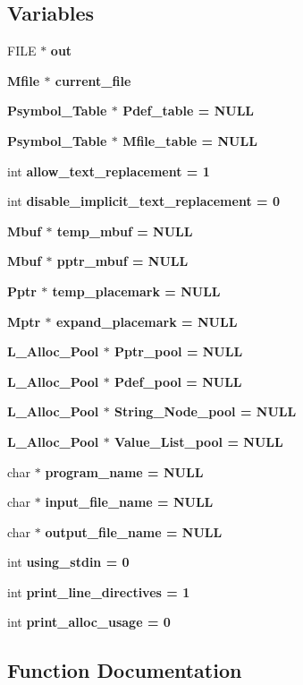 \subsection*{Variables}
\begin{CompactItemize}
\item 
FILE $\ast$ \bf{out}
\item 
\bf{Mfile} $\ast$ \bf{current\_\-file}
\item 
\bf{Psymbol\_\-Table} $\ast$ \bf{Pdef\_\-table} = \bf{NULL}
\item 
\bf{Psymbol\_\-Table} $\ast$ \bf{Mfile\_\-table} = \bf{NULL}
\item 
int \bf{allow\_\-text\_\-replacement} = 1
\item 
int \bf{disable\_\-implicit\_\-text\_\-replacement} = 0
\item 
\bf{Mbuf} $\ast$ \bf{temp\_\-mbuf} = \bf{NULL}
\item 
\bf{Mbuf} $\ast$ \bf{pptr\_\-mbuf} = \bf{NULL}
\item 
\bf{Pptr} $\ast$ \bf{temp\_\-placemark} = \bf{NULL}
\item 
\bf{Mptr} $\ast$ \bf{expand\_\-placemark} = \bf{NULL}
\item 
\bf{L\_\-Alloc\_\-Pool} $\ast$ \bf{Pptr\_\-pool} = \bf{NULL}
\item 
\bf{L\_\-Alloc\_\-Pool} $\ast$ \bf{Pdef\_\-pool} = \bf{NULL}
\item 
\bf{L\_\-Alloc\_\-Pool} $\ast$ \bf{String\_\-Node\_\-pool} = \bf{NULL}
\item 
\bf{L\_\-Alloc\_\-Pool} $\ast$ \bf{Value\_\-List\_\-pool} = \bf{NULL}
\item 
char $\ast$ \bf{program\_\-name} = \bf{NULL}
\item 
char $\ast$ \bf{input\_\-file\_\-name} = \bf{NULL}
\item 
char $\ast$ \bf{output\_\-file\_\-name} = \bf{NULL}
\item 
int \bf{using\_\-stdin} = 0
\item 
int \bf{print\_\-line\_\-directives} = 1
\item 
int \bf{print\_\-alloc\_\-usage} = 0
\end{CompactItemize}


\subsection{Function Documentation}
